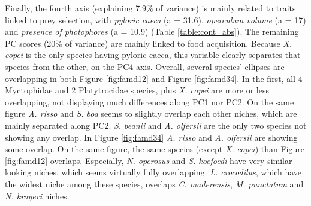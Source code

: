 Finally, the fourth axis (explaining 7.9\% of variance) is mainly related to traits linked to prey selection, with \emph{pyloric caeca} (a = 31.6), \emph{operculum volume} (a = 17) and \emph{presence of photophores} (a = 10.9) (Table \ref{table:cont_abs}). The remaining PC scores (20\% of variance) are mainly linked to food acquisition. Because \textit{X. copei} is the only species having pyloric caeca, this variable clearly separates that species from the other, on the PC4 axis.
Overall, several species' ellipses are overlapping in both Figure \ref{fig:famd12} and Figure \ref{fig:famd34}. In the first, all 4 Myctophidae and 2 Platytrocidae species, plus \textit{X. copei} are more or less overlapping, not displaying much differences along PC1 nor PC2. On the same figure \textit{A. risso} and \textit{S. boa} seems to slightly overlap each other niches, which are mainly separated along PC2. \textit{S. beanii} and \textit{A. olfersii} are the only two species not showing any overlap. 
In Figure \ref{fig:famd34} \textit{A. risso} and \textit{A. olfersii} are showing some overlap. On the same figure, the same species (except \textit{X. copei}) than Figure \ref{fig:famd12} overlaps. Especially, \textit{N. operosus} and \textit{S. koefoedi} have very similar looking niches, which seems virtually fully overlapping. \textit{L. crocodilus}, which have the widest niche among these species, overlaps \textit{C. maderensis}, \textit{M. punctatum} and \textit{N. kroyeri} niches. 


